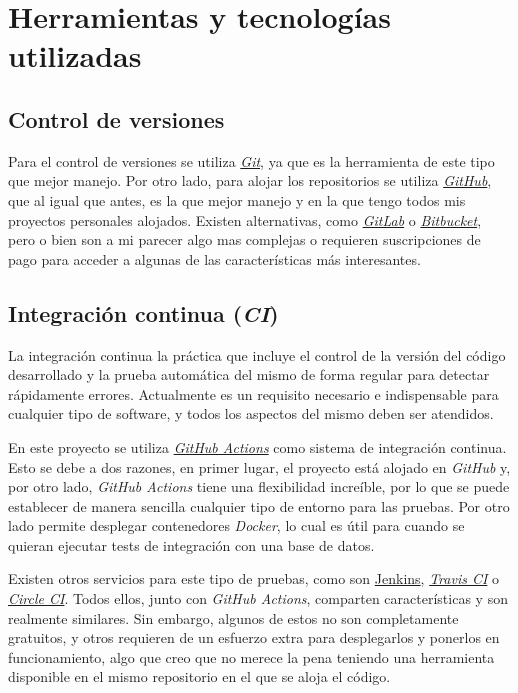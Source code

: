 \chapter{Herramientas y tecnologías utilizadas}

\section{Control de versiones}

Para el control de versiones se utiliza \href{https://git-scm.com/}{\textit{Git}}, ya que es la herramienta de este tipo que mejor manejo. Por otro lado, para alojar los repositorios se utiliza \href{https://github.com}{\textit{GitHub}}, que al igual que antes, es la que mejor manejo y en la que tengo todos mis proyectos personales alojados. Existen alternativas, como \href{https://about.gitlab.com/}{\textit{GitLab}} o \href{https://bitbucket.org/product/}{\textit{Bitbucket}}, pero o bien son a mi parecer algo mas complejas o requieren suscripciones de pago para acceder a algunas de las características más interesantes.

\section{Integración continua (\textit{CI})}

La integración continua la práctica que incluye el control de la versión del código desarrollado y la prueba automática del mismo de forma regular para detectar rápidamente errores. Actualmente es un requisito necesario e indispensable para cualquier tipo de software, y todos los aspectos del mismo deben ser atendidos.

En este proyecto se utiliza \href{https://github.com/features/actions}{\textit{GitHub Actions}} como sistema de integración continua. Esto se debe a dos razones, en primer lugar, el proyecto está alojado en \textit{GitHub} y, por otro lado, \textit{GitHub Actions} tiene una flexibilidad increíble, por lo que se puede establecer de manera sencilla cualquier tipo de entorno para las pruebas. Por otro lado permite desplegar contenedores \textit{Docker}, lo cual es útil para cuando se quieran ejecutar tests de integración con una base de datos.

Existen otros servicios para este tipo de pruebas, como son \href{https://www.jenkins.io/}{Jenkins}, \href{https://travis-ci.org/}{\textit{Travis CI}} o \href{https://circleci.com/}{\textit{Circle CI}}. Todos ellos, junto con \textit{GitHub Actions}, comparten características y son realmente similares. Sin embargo, algunos de estos no son completamente gratuitos, y otros requieren de un esfuerzo extra para desplegarlos y ponerlos en funcionamiento, algo que creo que no merece la pena teniendo una herramienta disponible en el mismo repositorio en el que se aloja el código.

